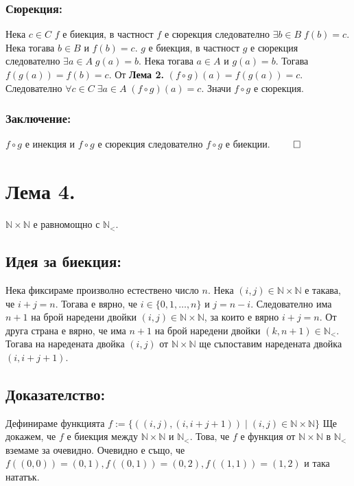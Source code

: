 \documentclass[a4paper, 12pt, oneside]{article}
\newcommand{\N}{\mathbb{N}}
\newcommand{\LN}{\N_<}
\begin{document}
\subsubsection*{Сюрекция:}
Нека \(c \in C\) \(f\) е биекция, в частност \(f\) е сюрекция
следователно \(\exists b \in B \; f(b) = c\).
Нека тогава \(b \in B\) и \(f(b) = c\).
\(g\) е биекция, в частност \(g\) е сюрекция
следователно \(\exists a \in A \; g(a) = b\).
Нека тогава \(a \in A\) и \(g(a) = b\).
Тогава \(f(g(a)) = f(b) = c\).
От \textbf{Лема 2.} \((f \circ g)(a) = f(g(a)) = c\).
Следователно \(\forall c \in C \; \exists a \in A \; (f \circ g)(a) = c\).
Значи \(f \circ g\) е сюрекция.
\subsubsection*{Заключение:}
\(f \circ g\) е инекция и \(f \circ g\) е сюрекция следователно \(f \circ g\) е биекции. \(\qed\)
\section*{Лема 4.}
\(\N\times\N\) е равномощно с \(\LN\).
\subsection*{Идея за биекция:}
Нека фиксираме произволно естествено число \(n\).
Нека \((i, j) \in \N\times\N\) е такава, че \(i + j = n\).
Тогава е вярно, че \(i \in \{0, 1, \dots, n\}\) и \(j = n - i\).
Следователно има \(n + 1\) на брой наредени двойки \((i, j) \in \N\times\N\),
за които е вярно \(i + j = n\). От друга страна е вярно, че
има \(n + 1\) на брой наредени двойки \((k, n + 1) \in \LN\).
Тогава на наредената двойка \((i, j)\) от \(\N\times\N\) ще съпоставим наредената двойка \((i, i + j + 1)\).
\subsection*{Доказателство:}
Дефинираме функцията \(f := \{((i, j), (i, i + j + 1)) \; | \; (i, j) \in \N\times\N\}\)
Ще докажем, че \(f\) е биекция между \(\N\times\N\) и \(\LN\). Това, че \(f\) е функция от \(\N\times\N\) в \(\LN\) вземаме за очевидно.
Очевидно е също, че \(f((0, 0)) = (0, 1), f((0, 1)) = (0, 2), f((1, 1)) = (1, 2)\) и така нататък.
\end{document}
